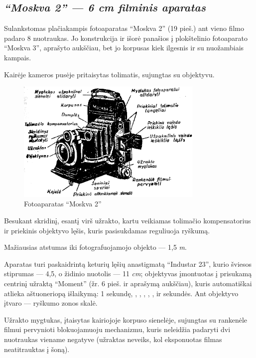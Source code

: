 \documentclass[12pt]{book}
\begin{document}
		\subsection*{\textit{``Moskva 2'' --- 6  cm filminis aparatas}}
			Sulankstomas plačiakampis fotoaparatas ``Moskva 2'' (19 pieš.) ant vieno filmo padaro 8 nuotraukas. Jo konstrukcija ir išorė panašios į plokštelinio fotoaparato ``Moskva 3'', aprašyto aukščiau, bet jo korpusas kiek ilgesnis ir su nuožambiais kampais.

			Kairėje kameros pusėje pritaisytas tolimatis, sujungtas su objektyvu.
			\begin{figure}[h]
				\centering
				\includegraphics[width=0.8\textwidth]{19-pav}
				\caption{Fotoaparatas ``Moskva 2''}
				\label{fig:19}
			\end{figure}
			Besukant skridinį, esantį virš užrakto, kartu veikiamas tolimačio kompensatorius ir priekinis objektyvo lęšis, kuris pasisukdamas reguliuoja ryškumą.

			Mažiausias atstumas iki fotografuojamojo objekto --- 1,5 \textit{m}.

			Aparatas turi paskaidrintą keturių lęšių anastigmatą ``Industar 23'', kurio šviesos stiprumas --- 4,5, o židinio nuotolis --- 11 \textit{cm}; objektyvas įmontuotas į prisukamą centrinį užraktą ``Moment'' (žr. 6 pieš. ir aprašymą aukščiau), kuris automatiškai atlieka aštuoneriopą išlaikymą: 1 sekundę, , , , , ,  ir  sekundės. Ant objektyvo įtvaro --- ryškumo zonos skalė.

			Užrakto mygtukas, įtaisytas kairiojoje korpuso sienelėje, sujungtas su rankenėle filmui pervynioti blokuojamuoju mechanizmu, kuris neleidžia padaryti dvi nuotraukas viename negatyve (užraktas neveiks, kol eksponuotas filmas neatitrauktas į šoną).
\end{document}
